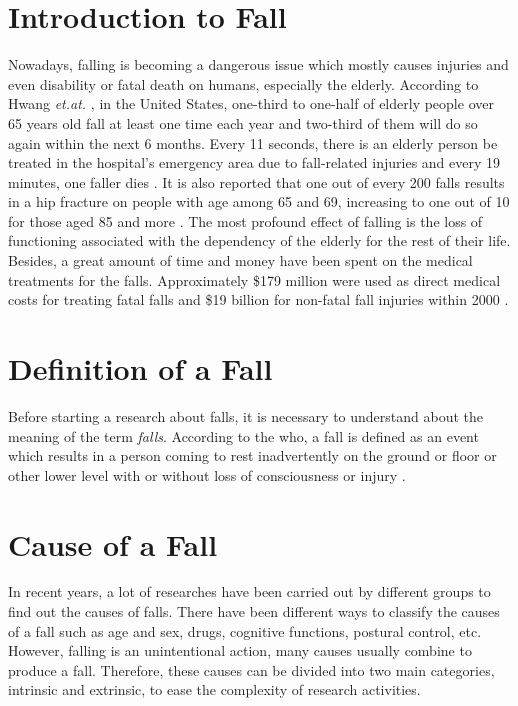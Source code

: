 \documentclass[letterpaper,12pt,titlepage,oneside,final]{book}
\begin{document}
\section{Introduction to Fall}
Nowadays, falling is becoming a dangerous issue which mostly causes injuries and even disability or fatal death on humans, especially the elderly. According to Hwang \textit{et.at.} \cite{static1}, in the United States, one-third to one-half of elderly people over 65 years old fall at least one time each year  and two-third of them will do so again within the next 6 months. Every 11 seconds, there is an elderly person be treated in the hospital's emergency area due to fall-related injuries and every 19 minutes, one faller dies \cite{ncoa}. It is also reported that one out of every 200 falls results in a hip fracture on people with age among 65 and 69, increasing to one out of 10 for those aged 85 and more \cite{hip_fracture}. The most profound effect of falling is the loss of functioning associated with the dependency of the elderly for the rest of their life. Besides, a great amount of time and money have been spent on the medical treatments for the falls. Approximately \$179 million were used as direct medical costs for treating fatal falls and \$19 billion for non-fatal fall injuries within 2000 \cite{cost_fatal}.

\section{Definition of a Fall}
Before starting a research about falls, it is necessary to understand about the meaning of the term \textit{falls}. According to the \gls{who}, a fall is defined as an event which results in a person coming to rest inadvertently on the ground or floor or other lower level with or without loss of consciousness or injury \cite{who}. 

\section{Cause of a Fall}
In recent years, a lot of researches have been carried out by different groups to find out the causes of falls. There have been different ways to classify the causes of a fall such as age and sex, drugs, cognitive functions, postural control, etc. However, falling is an unintentional action, many causes usually combine to produce a fall. Therefore, these causes can be divided into two main categories, intrinsic and extrinsic, to ease the complexity of research activities.
\end{document}
